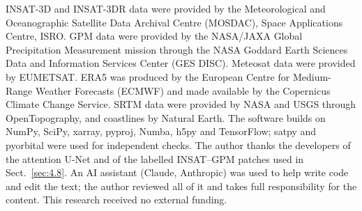 \documentclass[amt, manuscript]{copernicus}
\begin{document}

\begin{acknowledgements}
INSAT-3D and INSAT-3DR data were provided by the Meteorological and Oceanographic Satellite Data Archival Centre (MOSDAC), Space Applications Centre, ISRO. GPM data were provided by the NASA/JAXA Global Precipitation Measurement mission through the NASA Goddard Earth Sciences Data and Information Services Center (GES DISC). Meteosat data were provided by EUMETSAT. ERA5 was produced by the European Centre for Medium-Range Weather Forecasts (ECMWF) and made available by the Copernicus Climate Change Service. SRTM data were provided by NASA and USGS through OpenTopography, and coastlines by Natural Earth. The software builds on NumPy, SciPy, xarray, pyproj, Numba, h5py and TensorFlow; satpy and pyorbital were used for independent checks. The author thanks the developers of the attention U-Net and of the labelled INSAT--GPM patches used in Sect.~\ref{sec:4.8}. An AI assistant (Claude, Anthropic) was used to help write code and edit the text; the author reviewed all of it and takes full responsibility for the content. This research received no external funding.
\end{acknowledgements}



\end{document}
